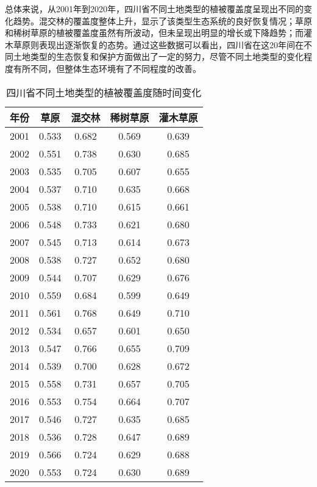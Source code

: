 \documentclass[AutoFakeBold]{LZUThesis-PgD&PhD}
\begin{document}
    总体来说，从2001年到2020年，四川省不同土地类型的植被覆盖度呈现出不同的变化趋势。混交林的覆盖度整体上升，显示了该类型生态系统的良好恢复情况；草原和稀树草原的植被覆盖度虽然有所波动，但未呈现出明显的增长或下降趋势；而灌木草原则表现出逐渐恢复的态势。通过这些数据可以看出，四川省在这20年间在不同土地类型的生态恢复和保护方面做出了一定的努力，尽管不同土地类型的变化程度有所不同，但整体生态环境有了不同程度的改善。
        \begin{table}[H]
            \centering
            \begin{tabular}{|c|c|c|c|c|}
                \hline
                \textbf{年份} & \textbf{草原} & \textbf{混交林} & \textbf{稀树草原} & \textbf{灌木草原} \\
                \hline
                2001 & 0.533 & 0.682 & 0.569 & 0.639 \\
                2002 & 0.551 & 0.738 & 0.630 & 0.685 \\
                2003 & 0.535 & 0.705 & 0.607 & 0.655 \\
                2004 & 0.537 & 0.710 & 0.635 & 0.668 \\
                2005 & 0.538 & 0.710 & 0.615 & 0.661 \\
                2006 & 0.548 & 0.733 & 0.621 & 0.680 \\
                2007 & 0.545 & 0.713 & 0.614 & 0.673 \\
                2008 & 0.538 & 0.727 & 0.652 & 0.680 \\
                2009 & 0.544 & 0.707 & 0.629 & 0.676 \\
                2010 & 0.559 & 0.684 & 0.599 & 0.649 \\
                2011 & 0.561 & 0.768 & 0.649 & 0.710 \\
                2012 & 0.534 & 0.657 & 0.601 & 0.650 \\
                2013 & 0.547 & 0.766 & 0.655 & 0.709 \\
                2014 & 0.539 & 0.700 & 0.628 & 0.672 \\
                2015 & 0.558 & 0.731 & 0.657 & 0.705 \\
                2016 & 0.553 & 0.754 & 0.664 & 0.707 \\
                2017 & 0.546 & 0.727 & 0.635 & 0.685 \\
                2018 & 0.536 & 0.728 & 0.647 & 0.689 \\
                2019 & 0.566 & 0.724 & 0.629 & 0.688 \\
                2020 & 0.553 & 0.724 & 0.630 & 0.689 \\
                \hline
            \end{tabular}
            \caption{四川省不同土地类型的植被覆盖度随时间变化}
        \end{table}
    
\end{document}
